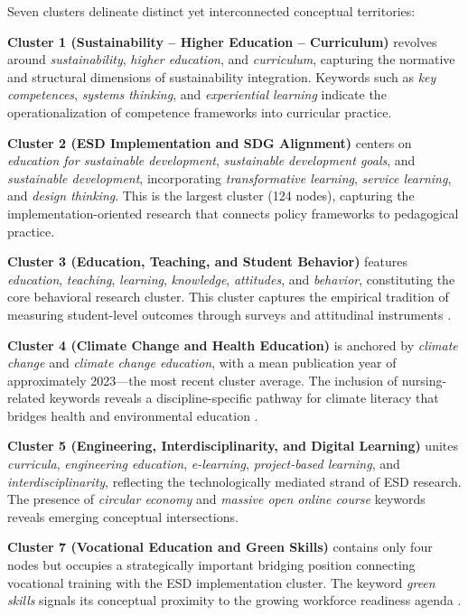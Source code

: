 \documentclass[pdflatex,sn-basic]{sn-jnl}%
\begin{document}
Seven clusters delineate distinct yet interconnected conceptual territories:

\textbf{Cluster 1 (Sustainability -- Higher Education -- Curriculum)} revolves around \textit{sustainability}, \textit{higher education}, and \textit{curriculum}, capturing the normative and structural dimensions of sustainability integration. Keywords such as \textit{key competences}, \textit{systems thinking}, and \textit{experiential learning} indicate the operationalization of competence frameworks into curricular practice.

\textbf{Cluster 2 (ESD Implementation and SDG Alignment)} centers on \textit{education for sustainable development}, \textit{sustainable development goals}, and \textit{sustainable development}, incorporating \textit{transformative learning}, \textit{service learning}, and \textit{design thinking}. This is the largest cluster (124 nodes), capturing the implementation-oriented research that connects policy frameworks to pedagogical practice.

\textbf{Cluster 3 (Education, Teaching, and Student Behavior)} features \textit{education}, \textit{teaching}, \textit{learning}, \textit{knowledge}, \textit{attitudes}, and \textit{behavior}, constituting the core behavioral research cluster. This cluster captures the empirical tradition of measuring student-level outcomes through surveys and attitudinal instruments \cite{badea_impact_2020, alvarez-garcia_variables_2019}.

\textbf{Cluster 4 (Climate Change and Health Education)} is anchored by \textit{climate change} and \textit{climate change education}, with a mean publication year of approximately 2023---the most recent cluster average. The inclusion of nursing-related keywords reveals a discipline-specific pathway for climate literacy that bridges health and environmental education \cite{alvarez-nieto_developing_2018, bishr_effectiveness_2026}.

\textbf{Cluster 5 (Engineering, Interdisciplinarity, and Digital Learning)} unites \textit{curricula}, \textit{engineering education}, \textit{e-learning}, \textit{project-based learning}, and \textit{interdisciplinarity}, reflecting the technologically mediated strand of ESD research. The presence of \textit{circular economy} and \textit{massive open online course} keywords reveals emerging conceptual intersections.

\textbf{Cluster 7 (Vocational Education and Green Skills)} contains only four nodes but occupies a strategically important bridging position connecting vocational training with the ESD implementation cluster. The keyword \textit{green skills} signals its conceptual proximity to the growing workforce readiness agenda \cite{carstensen_mapping_2025, da_costa_addressing_2025}.
\end{document}
